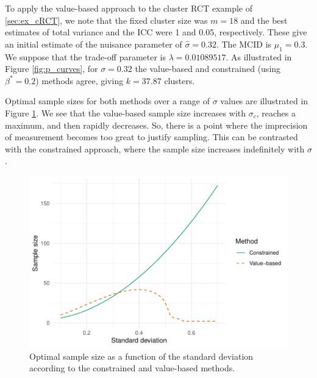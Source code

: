 \documentclass[sagev, Crown]{sagej}
\begin{document}
To apply the value-based approach to the cluster RCT example of \ref{sec:ex_cRCT}, we note that the fixed cluster size was $m = 18$ and the best estimates of total variance and the ICC were 1 and 0.05, respectively. These give an initial estimate of the nuisance parameter of $\hat{\sigma} = 0.32$. The MCID is $\mu_1 = 0.3$. We suppose that the trade-off parameter is $\lambda = 0.01089517$. As illustrated in Figure \ref{fig:p_curves}, for  $\sigma = 0.32$ the value-based and constrained (using $\beta^* = 0.2$) methods agree, giving $ k = 37.87$ clusters.

Optimal sample sizes for both methods over a range of $\sigma$ values are illustrated in Figure \ref{fig:opt_t_test}. We see that the value-based sample size increases with $\sigma_c$, reaches a maximum, and then rapidly decreases. So, there is a point where the imprecision of measurement becomes too great to justify sampling. This can be contrasted with the constrained approach, where the sample size increases indefinitely with $\sigma$.

\begin{figure}
\centering
\includegraphics[scale=0.8]{./figures/opt_t_test}
\caption{Optimal sample size as a function of the standard deviation according to the constrained and value-based methods.}
\label{fig:opt_t_test}
\end{figure}
\end{document}
